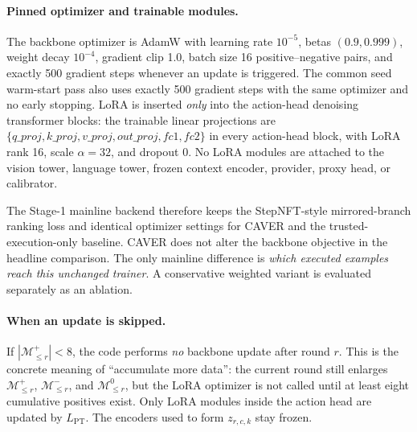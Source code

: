 \documentclass[10pt]{article}
\theoremstyle{plain}
\theoremstyle{definition}
\theoremstyle{remark}
\begin{document}
\paragraph{Pinned optimizer and trainable modules.}
The backbone optimizer is AdamW with learning rate $10^{-5}$, betas $(0.9,0.999)$, weight decay $10^{-4}$, gradient clip 1.0, batch size 16 positive--negative pairs, and exactly 500 gradient steps whenever an update is triggered. The common seed warm-start pass also uses exactly 500 gradient steps with the same optimizer and no early stopping. LoRA is inserted \emph{only} into the action-head denoising transformer blocks: the trainable linear projections are $\{q\_proj,k\_proj,v\_proj,out\_proj,fc1,fc2\}$ in every action-head block, with LoRA rank 16, scale $\alpha=32$, and dropout 0. No LoRA modules are attached to the vision tower, language tower, frozen context encoder, provider, proxy head, or calibrator.

The Stage-1 mainline backend therefore keeps the StepNFT-style mirrored-branch ranking loss and identical optimizer settings for CAVER and the trusted-execution-only baseline. CAVER does not alter the backbone objective in the headline comparison. The only mainline difference is \emph{which executed examples reach this unchanged trainer}. A conservative weighted variant is evaluated separately as an ablation.

\paragraph{When an update is skipped.}
If $|\mathcal M_{\le r}^{+}|<8$, the code performs \emph{no} backbone update after round $r$. This is the concrete meaning of ``accumulate more data'': the current round still enlarges $\mathcal M_{\le r}^{+}$, $\mathcal M_{\le r}^{-}$, and $\mathcal M_{\le r}^{0}$, but the LoRA optimizer is not called until at least eight cumulative positives exist. Only LoRA modules inside the action head are updated by $L_{\mathrm{PT}}$. The encoders used to form $z_{r,c,k}$ stay frozen.
\end{document}

